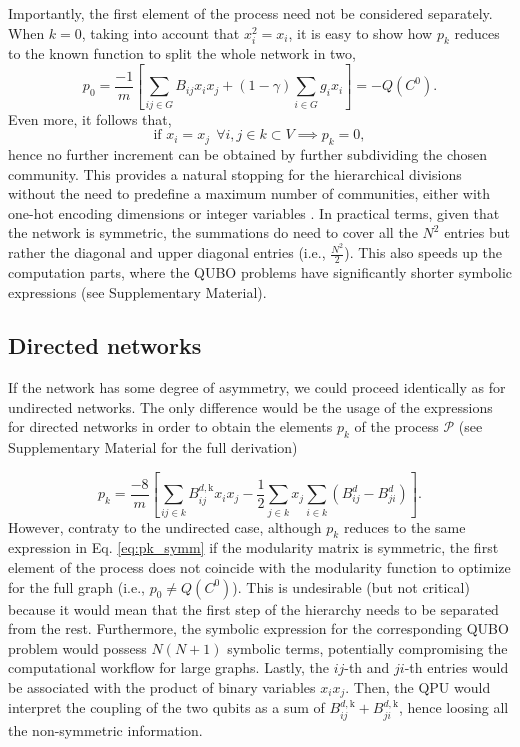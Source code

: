 \documentclass[pdflatex,sn-mathphys-num]{sn-jnl}%
\begin{document}
Importantly, the first element of the process need not be considered separately. When $k=0$, taking into account that $x_i^2 = x_i$, it is easy to show how $p_k$ reduces to the known function to split the whole network in two,$$ p_0 = \frac{-1}{m} \left[ \sum_{ij\in G} B_{ij} x_i x_j + (1-\gamma)\sum_{i\in G} g_{i} x_i \right] = -Q(C^{0}).$$ Even more, it follows that, $$\text{if } x_i=x_j \ \ \forall i,j \in k \subset V \implies p_k = 0,$$ hence no further increment can be obtained by further subdividing the chosen community. This provides a natural stopping for the hierarchical divisions without the need to predefine a maximum number of communities, either with one-hot encoding dimensions \cite{Ushijima-Mwesigwa2017,Negre2020} or integer variables \cite{Wierzbinski2023}. In practical terms, given that the network is symmetric, the summations do need to cover all the $N^2$ entries but rather the diagonal and upper diagonal entries (i.e., $\frac{N^2}{2}$). This also speeds up the computation parts, where the QUBO problems have significantly shorter symbolic expressions (see Supplementary Material).

\subsection*{Directed networks}
If the network has some degree of asymmetry, we could proceed identically as for undirected networks. The only difference would be the usage of the expressions for directed networks in order to obtain the elements $p_k$ of the process $\mathcal{P}$ (see Supplementary Material for the full derivation) 

\begin{equation} \label{eq:pk_dir}
    p_k = \frac{-8}{m} \left[ \sum_{ij \in k} B_{ij}^{d,\text{k}} x_i x_j  - \frac{1}{2} \sum_{j\in k} x_j \sum_{i\in k} \left(B_{ij}^d - B_{ji}^d \right)\right].
\end{equation}
However, contraty to the undirected case, although $p_k$ reduces to the same expression in Eq. \ref{eq:pk_symm} if the modularity matrix is symmetric, the first element of the process does not coincide with the modularity function to optimize for the full graph (i.e., $p_0 \neq Q(C^0)$). This is undesirable (but not critical) because it would mean that the first step of the hierarchy needs to be separated from the rest. Furthermore, the symbolic expression for the corresponding QUBO problem would possess $N(N+1)$ symbolic terms, potentially compromising the computational workflow for large graphs. Lastly, the $ij$-th and $ji$-th entries would be associated with the product of binary variables $x_i x_j$. Then, the QPU would interpret the coupling of the two qubits as a sum of $B_{ij}^{d,\text{k}} + B_{ji}^{d,\text{k}}$, hence loosing all the non-symmetric information. 
\end{document}
